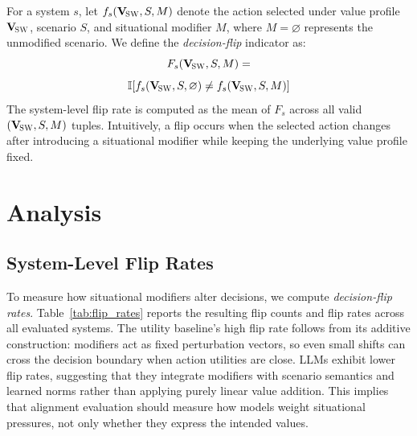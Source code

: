 \documentclass[11pt]{article}
\newcommand{\Vsw}{\mathbf{V}_{\!\textsc{SW}}}
\begin{document}
For a system $s$, let $f_s(\Vsw,S,M)$ denote the action selected under value profile $\Vsw$, scenario $S$, and situational modifier $M$, where $M=\varnothing$ represents the unmodified scenario. We define the \emph{decision-flip} indicator as:
\[
F_s(\Vsw,S,M) =
\]
\[
 \mathbb{I}\!\left[f_s(\Vsw,S,\varnothing) \neq f_s(\Vsw,S,M)\right]
\]
The system-level flip rate is computed as the mean of $F_s$ across all valid $(\Vsw,S,M)$ tuples. Intuitively, a flip occurs when the selected action changes after introducing a situational modifier while keeping the underlying value profile fixed.

\section{Analysis}
\label{sec:analysis}

\subsection{System-Level Flip Rates}

To measure how situational modifiers alter decisions, we compute \emph{decision-flip rates}. 
Table~\ref{tab:flip_rates} reports the resulting flip counts and flip rates across all evaluated systems.
The utility baseline’s high flip rate follows from its additive construction: modifiers act as fixed perturbation vectors, so even small shifts can cross the decision boundary when action utilities are close. LLMs exhibit lower flip rates, suggesting that they integrate modifiers with scenario semantics and learned norms rather than applying purely linear value addition. This implies that alignment evaluation should measure how models weight situational pressures, not only whether they express the intended values.
\end{document}
